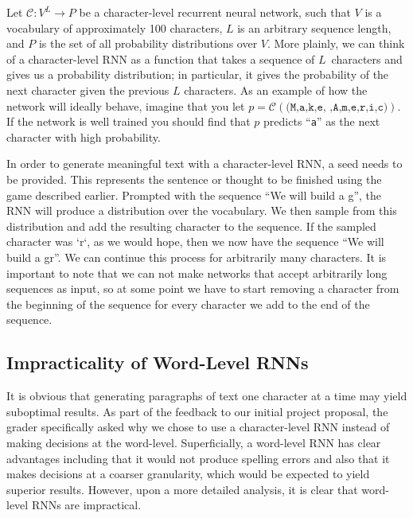 \documentclass{article}
\begin{document}
Let $\mathcal{C} : V^L \rightarrow P$ be a character-level recurrent neural network, such that $V$ is a vocabulary of approximately 100 characters, $L$ is an arbitrary sequence length, and $P$ is the set of all probability distributions over $V$. More plainly, we can think of a character-level RNN as a function that takes a sequence of $L$~characters and gives us a probability distribution; in particular, it gives the probability of the next character given the previous $L$ characters. As an example of how the network will ideally behave, imagine that you let $p = \mathcal{C}(\texttt{(M,a,k,e, ,A,m,e,r,i,c)})$. If the network is well trained you should find that $p$ predicts ``\texttt{a}'' as the next character with high probability.

In order to generate meaningful text with a character-level RNN, a seed needs to be provided.  This represents the sentence or thought to be finished using the game described earlier. Prompted with the sequence ``We will build a g'', the RNN will produce a distribution over the vocabulary. We then sample from this distribution and add the resulting character to the sequence. If the sampled character was `r`, as we would hope, then we now have the sequence ``We will build a gr''. We can continue this process for arbitrarily many characters. It is important to note that we can not make networks that accept arbitrarily long sequences as input, so at some point we have to start removing a character from the beginning of the sequence for every character we add to the end of the sequence.

\subsection{Impracticality of Word-Level RNNs}\label{sec:wordLevelRnn}

It is obvious that generating paragraphs of text one character at a time may yield suboptimal results.  As part of the feedback to our initial project proposal, the grader specifically asked why we chose to use a character-level RNN instead of making decisions at the word-level.  Superficially, a word-level RNN has clear advantages including that it would not produce spelling errors and also that it makes decisions at a coarser granularity, which would be expected to yield superior results.  However, upon a more detailed analysis, it is clear that word-level RNNs are impractical.
\end{document}
